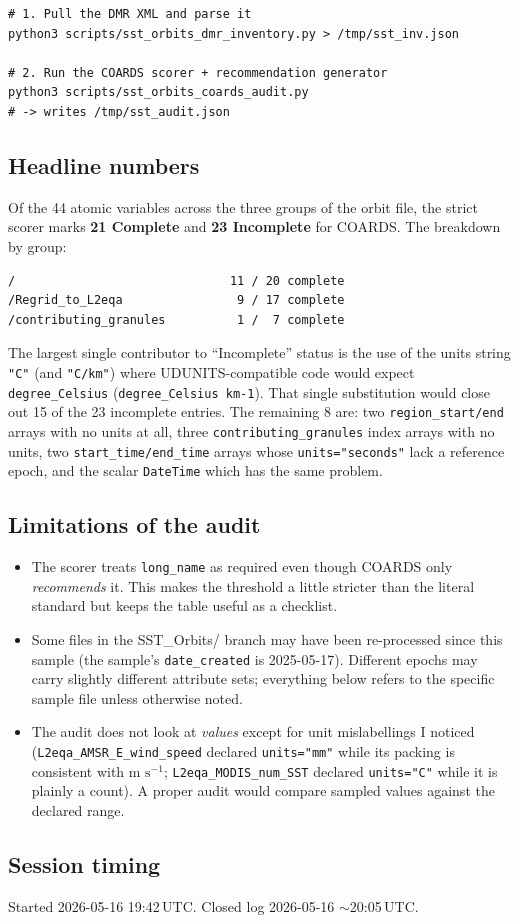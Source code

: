 \documentclass[11pt]{article}
\begin{document}
\begin{lstlisting}
# 1. Pull the DMR XML and parse it
python3 scripts/sst_orbits_dmr_inventory.py > /tmp/sst_inv.json

# 2. Run the COARDS scorer + recommendation generator
python3 scripts/sst_orbits_coards_audit.py
# -> writes /tmp/sst_audit.json
\end{lstlisting}

\subsection{Headline numbers}

Of the 44 atomic variables across the three groups of the orbit
file, the strict scorer marks \textbf{21 Complete} and
\textbf{23 Incomplete} for COARDS. The breakdown by group:

\begin{lstlisting}
/                              11 / 20 complete
/Regrid_to_L2eqa                9 / 17 complete
/contributing_granules          1 /  7 complete
\end{lstlisting}

The largest single contributor to ``Incomplete'' status is the use
of the units string \texttt{"C"} (and \texttt{"C/km"}) where
UDUNITS-compatible code would expect \texttt{degree\_Celsius}
(\texttt{degree\_Celsius km-1}). That single substitution would
close out 15 of the 23 incomplete entries. The remaining 8 are:
two \texttt{region\_start/end} arrays with no units at all, three
\texttt{contributing\_granules} index arrays with no units, two
\texttt{start\_time/end\_time} arrays whose \texttt{units="seconds"}
lack a reference epoch, and the scalar \texttt{DateTime} which has
the same problem.

\subsection{Limitations of the audit}

\begin{itemize}
  \item The scorer treats \texttt{long\_name} as required even
    though COARDS only \emph{recommends} it. This makes the
    threshold a little stricter than the literal standard but
    keeps the table useful as a checklist.
  \item Some files in the SST\_Orbits/ branch may have been
    re-processed since this sample (the sample's
    \texttt{date\_created} is 2025-05-17). Different epochs may
    carry slightly different attribute sets; everything below
    refers to the specific sample file unless otherwise noted.
  \item The audit does not look at \emph{values} except for unit
    mislabellings I noticed (\texttt{L2eqa\_AMSR\_E\_wind\_speed}
    declared \texttt{units="mm"} while its packing is consistent
    with $\text{m s}^{-1}$;
    \texttt{L2eqa\_MODIS\_num\_SST} declared \texttt{units="C"}
    while it is plainly a count). A proper audit would compare
    sampled values against the declared range.
\end{itemize}

\subsection{Session timing}

Started 2026-05-16 19:42\,UTC. Closed log 2026-05-16
$\sim$20:05\,UTC.
\end{document}
